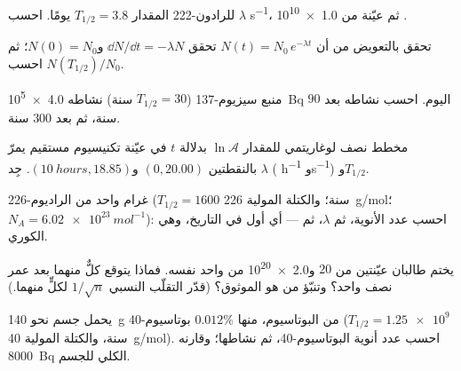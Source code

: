 \begin{exercise}[$\star$]\label{exo:g12:radioactive-decay:2}
للرادون-222 المقدار $T_{1/2} = 3.8$ يومًا. احسب $\lambda$  \unit{s^{-1}}،
ثم  عيّنة من \num{1.0e10} .
\end{exercise}

\begin{exercise}[$\star$]\label{exo:g12:radioactive-decay:3}
تحقق بالتعويض من أن $N(t) = N_0\,e^{-\lambda t}$ تحقق
$\dd N/\dd t = -\lambda N$ و$N(0) = N_0$؛ ثم احسب $N(T_{1/2})/N_0$.
\end{exercise}

\begin{exercise}[$\star$]\label{exo:g12:radioactive-decay:4}
منبع سيزيوم-137 ($T_{1/2} = 30$ سنة) نشاطه \qty{4.0e5}{Bq}
اليوم. احسب نشاطه بعد $90$ سنة، ثم بعد $300$ سنة.
\end{exercise}

\begin{exercise}[$\star$]\label{exo:g12:radioactive-decay:5}
مخطط نصف لوغاريتمي للمقدار $\ln \mathcal A$ بدلالة $t$ في عيّنة تكنيسيوم
مستقيم يمرّ بالنقطتين $(0, 20.00)$ و$(\qty{10}{hours}, 18.85)$. جِد
$\lambda$ ( \unit{h^{-1}} و\unit{s^{-1}}) و$T_{1/2}$.
\end{exercise}

\begin{exercise}[$\star\star$]\label{exo:g12:radioactive-decay:6}
غرام واحد من الراديوم-226 ($T_{1/2} = 1600$ سنة؛ والكتلة المولية
\qty{226}{g/mol}؛ $N_A = \qty{6.02e23}{mol^{-1}}$): احسب عدد
الأنوية، ثم $\lambda$، ثم  --- أي أول   في
التاريخ، وهي الكوري.
\end{exercise}

\begin{exercise}[$\star\star$]\label{exo:g12:radioactive-decay:7}
يختم طالبان عيّنتين من $20$ و\num{2.0e20}  من 
واحد نفسه. فماذا يتوقع كلٌّ منهما بعد عمر نصف واحد؟ وتنبّؤ من هو
الموثوق؟ (قدّر التقلّب النسبي $1/\sqrt n$ لكلٍّ منهما.)
\end{exercise}

\begin{exercise}[$\star\star$]\label{exo:g12:radioactive-decay:8}
يحمل جسم نحو \qty{140}{g} من البوتاسيوم، منها $0.012\%$
بوتاسيوم-40 ($T_{1/2} = \num{1.25e9}$ سنة، والكتلة المولية \qty{40}{g/mol}).
احسب عدد أنوية البوتاسيوم-40، ثم نشاطها؛ وقارنه
 \qty{8000}{Bq} الكلي للجسم.
\end{exercise}

